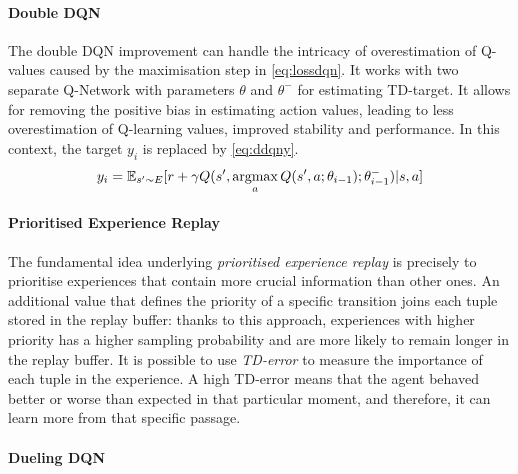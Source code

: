 \paragraph{Double DQN}
The double DQN \cite{hasselt2010double, van2016deep} improvement can handle the intricacy of overestimation of Q-values caused by the maximisation step in \vref{eq:lossdqn}. It works with two separate Q-Network with parameters $\theta$ and $\theta^-$ for estimating TD-target. It allows for removing the positive bias in estimating action values, leading to less overestimation of Q-learning values, improved stability and performance. In this context, the target $y_i$ is replaced by \vref{eq:ddqny}.
\begin{equation} \label{eq:ddqny}
	y_i = \mathbb{E}_{s' \sim E}[r + \gamma Q(s',\operatornamewithlimits{argmax}_aQ(s', a; \theta_{i-1}); \theta^-_{i-1})|s,a]
\end{equation}
\paragraph{Prioritised Experience Replay}

The fundamental idea underlying \textit{prioritised experience replay} \cite{schaul2015prioritized} is precisely to prioritise experiences that contain more crucial information than other ones. An additional value that defines the priority of a specific transition joins each tuple stored in the replay buffer: thanks to this approach, experiences with higher priority has a higher sampling probability and are more likely to remain longer in the replay buffer. It is possible to use \textit{TD-error} to measure the importance of each tuple in the experience. A high TD-error means that the agent behaved better or worse than expected in that particular moment, and therefore, it can learn more from that specific passage.

\paragraph{Dueling DQN}

